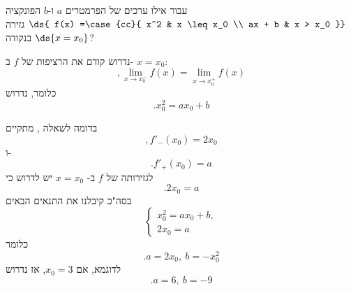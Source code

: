 עבור אילו ערכים של הפרמטרים \(a\) ו-\(b\) הפונקציה
$\ds{ f(x) =\case{cc}{  x^2 & x \leq x_0 \\ ax + b & x > x_0 }}$
גזירה בנקודה $\ds{x = x_0}$?

\ifsol
{}
\begin{solbox}
נדרוש קודם את הרציפות של
$f$
ב-
$x=x_0$:
$$,\lim_{x\to x_0^-}f(x)=\lim_{x\to x_0^+}f(x)$$
כלומר, נדרוש
$$.x_0^2=ax_0+b$$

בדומה לשאלה ,
מתקיים
    $$,f'_-(x_0)=2x_0$$
    ו-
    $$.f'_+(x_0)=a$$
לגזירותה של
$f$
ב-
$x=x_0$
יש לדרוש כי
$$.2x_0=a$$
בסה"כ קיבלנו את התנאים הבאים
\[
\begin{cases}
x_0^2 = a x_0 + b,\\
2x_0 = a
\end{cases}
\]
כלומר
$$.a=2x_0,\ b=-x_0^2$$
לדוגמא, אם
$x_0=3$,
אז נדרוש
$$.a=6,\ b=-9$$
\end{solbox}
\fi
